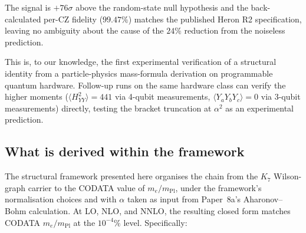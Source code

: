 \documentclass[11pt]{article}
\newcommand{\mPl}{m_{\mathrm{Pl}}}
\begin{document}
The signal is $+76\sigma$ above the random-state null hypothesis
and the back-calculated per-CZ fidelity ($99.47\%$) matches the
published Heron R2 specification, leaving no ambiguity about the
cause of the $24\%$ reduction from the noiseless prediction.

This is, to our knowledge, the first experimental verification of a
structural identity from a particle-physics mass-formula derivation
on programmable quantum hardware.  Follow-up runs on the same hardware
class can verify the higher moments
($\langle H_{YY}^2\rangle = 441$ via 4-qubit measurements,
$\langle Y_aY_bY_c\rangle = 0$ via 3-qubit measurements) directly,
testing the bracket truncation at $\alpha^2$ as an experimental
prediction.

\subsection{What is derived within the framework}
\label{sec:what-derived}

The structural framework presented here organises the chain from
the $K_7$ Wilson-graph carrier to the CODATA value of $m_e/\mPl$,
under the framework's normalisation choices and with $\alpha$ taken
as input from Paper~8a's Aharonov--Bohm calculation.  At LO, NLO,
and NNLO, the resulting closed form matches CODATA $m_e/\mPl$ at
the $10^{-4}\%$ level.  Specifically:
\end{document}
